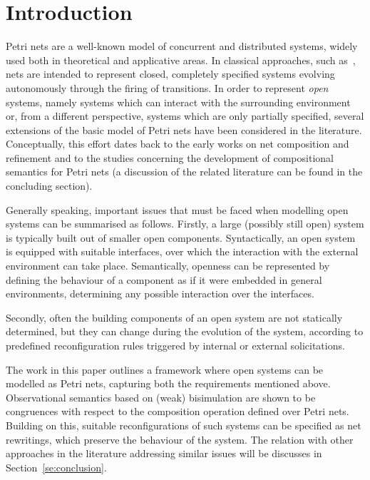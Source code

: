\documentclass{LMCS}
\begin{document}
\maketitle


\section*{Introduction}


Petri nets are a well-known model of concurrent and distributed
systems, widely used both in theoretical and applicative areas.
In classical approaches, such as~\cite{Rei:PNI}, nets are
intended to represent closed, completely specified systems evolving
autonomously through the firing of transitions.
In order to represent \emph{open} systems, namely systems which can
interact with the surrounding environment or, from a different
perspective, systems which are only partially specified, several
extensions of the basic model of Petri nets have been considered in
the literature. Conceptually, this effort dates back to the early
works on net composition and refinement and to the studies concerning
the development of compositional semantics for Petri nets (a
discussion of the related literature can be found in the concluding
section).



Generally speaking, important issues that must be faced when modelling
open systems can be summarised as follows.
Firstly, a large (possibly still open) system is typically built out
of smaller open components.  Syntactically, an open system is equipped
with suitable interfaces, over which the interaction with the external
environment can take place.  Semantically, openness can be represented
by defining the behaviour of a component as if it were embedded in
general environments, determining any possible interaction over the
interfaces.


Secondly, often the building components of an open system are not
statically determined, but they can change during the evolution of the
system, according to predefined reconfiguration rules triggered by
internal or external solicitations.



The work in this paper outlines a framework where open systems can be
modelled as Petri nets, capturing both the requirements mentioned
above. Observational semantics based on (weak) bisimulation are shown
to be congruences with respect to the composition operation defined
over Petri nets. Building on this, suitable reconfigurations of such
systems can be specified as net rewritings, which preserve the
behaviour of the system.
The relation with other approaches in the literature addressing similar
issues will be discusses in Section~\ref{se:conclusion}.
\end{document}
